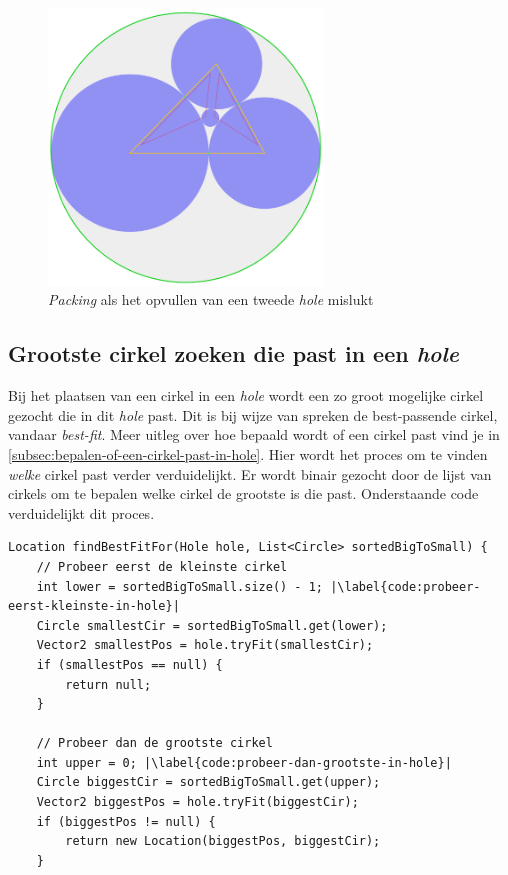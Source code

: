 \documentclass[12pt,a4paper,oneside]{book}
\begin{document}
{\begin{figure}
  \centering
  \includegraphics[width=0.65\textwidth]{voorbeeld-gat-stap-3alt.png}
  \caption{\textit{Packing} als het opvullen van een tweede \textit{hole} mislukt} \label{fig:voorbeeld-gat-stap-3alt} 
\end{figure}

\subsection{Grootste cirkel zoeken die past in een \textit{hole}} \label{sec:grootste-cirkel-zoeken-die-past-in-een-hole}

Bij het plaatsen van een cirkel in een \textit{hole} wordt een zo groot mogelijke cirkel gezocht die in dit \textit{hole} past.
Dit is bij wijze van spreken de best-passende cirkel, vandaar \textit{best-fit}.
Meer uitleg over hoe bepaald wordt of een cirkel past vind je in \autoref{subsec:bepalen-of-een-cirkel-past-in-hole}.
Hier wordt het proces om te vinden \textit{welke} cirkel past verder verduidelijkt.
Er wordt binair gezocht door de lijst van cirkels om te bepalen welke cirkel de grootste is die past.
Onderstaande code verduidelijkt dit proces.

\begin{lstlisting}
Location findBestFitFor(Hole hole, List<Circle> sortedBigToSmall) {
	// Probeer eerst de kleinste cirkel
	int lower = sortedBigToSmall.size() - 1; |\label{code:probeer-eerst-kleinste-in-hole}|
	Circle smallestCir = sortedBigToSmall.get(lower);
	Vector2 smallestPos = hole.tryFit(smallestCir);
	if (smallestPos == null) {
		return null;
	}

	// Probeer dan de grootste cirkel
	int upper = 0; |\label{code:probeer-dan-grootste-in-hole}|
	Circle biggestCir = sortedBigToSmall.get(upper);
	Vector2 biggestPos = hole.tryFit(biggestCir);
	if (biggestPos != null) {
		return new Location(biggestPos, biggestCir);
	}


\end{lstlisting}}
\end{document}
